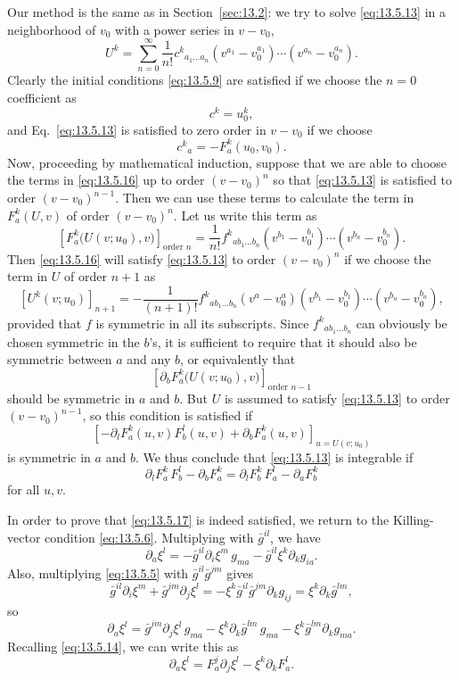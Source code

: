 Our method is the same as in Section~\ref{sec:13.2}: we try to solve
\eqref{eq:13.5.13} in a neighborhood of \(v_0\) with a power series in
\(v-v_0\),
\begin{equation}
  U^k
  =
  \sum_{n=0}^{\infty}
  \frac1{n!}
  c^k{}_{a_1\ldots a_n}
  (v^{a_1}-v_0^{a_1})\cdots(v^{a_n}-v_0^{a_n}).
  \tag{13.5.16}\label{eq:13.5.16}
\end{equation}
Clearly the initial conditions \eqref{eq:13.5.9} are satisfied if we choose
the \(n=0\) coefficient as
\[
  c^k=u_0^k,
\]
and Eq.~\eqref{eq:13.5.13} is satisfied to zero order in \(v-v_0\) if we
choose
\[
  c^k{}_a=-F_a^k(u_0,v_0).
\]
Now, proceeding by mathematical induction, suppose that we are able to
choose the terms in \eqref{eq:13.5.16} up to order \((v-v_0)^n\) so that
\eqref{eq:13.5.13} is satisfied to order \((v-v_0)^{n-1}\). Then we can
use these terms to calculate the term in \(F_a^k(U,v)\) of order
\((v-v_0)^n\). Let us write this term as
\[
  \left[
    F_a^k\bigl(U(v;u_0),v\bigr)
  \right]_{\text{order }n}
  =
  \frac1{n!}
  f^k{}_{a b_1\ldots b_n}
  (v^{b_1}-v_0^{b_1})\cdots(v^{b_n}-v_0^{b_n}).
\]
Then \eqref{eq:13.5.16} will satisfy \eqref{eq:13.5.13} to order
\((v-v_0)^n\) if we choose the term in \(U\) of order \(n+1\) as
\[
  \left[U^k(v;u_0)\right]_{n+1}
  =
  -\frac1{(n+1)!}
  f^k{}_{a b_1\ldots b_n}
  (v^a-v_0^a)
  (v^{b_1}-v_0^{b_1})\cdots(v^{b_n}-v_0^{b_n}),
\]
provided that \(f\) is symmetric in all its subscripts. Since
\(f^k{}_{a b_1\ldots b_n}\) can obviously be chosen symmetric in the
\(b\)'s, it is sufficient to require that it should also be symmetric
between \(a\) and any \(b\), or equivalently that
\[
  \left[
    \partial_b F_a^k\bigl(U(v;u_0),v\bigr)
  \right]_{\text{order }n-1}
\]
should be symmetric in \(a\) and \(b\). But \(U\) is assumed to satisfy
\eqref{eq:13.5.13} to order \((v-v_0)^{n-1}\), so this condition is
satisfied if
\[
  \left[
    -\partial_lF_a^k(u,v)F_b^l(u,v)
    +\partial_bF_a^k(u,v)
  \right]_{u=U(v;u_0)}
\]
is symmetric in \(a\) and \(b\). We thus conclude that
\eqref{eq:13.5.13} is integrable if
\begin{equation}
  \partial_lF_a^k\,F_b^l-\partial_bF_a^k
  =
  \partial_lF_b^k\,F_a^l-\partial_aF_b^k
  \tag{13.5.17}\label{eq:13.5.17}
\end{equation}
for all \(u,v\).

In order to prove that \eqref{eq:13.5.17} is indeed satisfied, we return to
the Killing-vector condition \eqref{eq:13.5.6}. Multiplying with
\(\bar g^{il}\), we have
\[
  \partial_a\xi^l
  =
  -\bar g^{il}\partial_i\xi^m\,g_{ma}
  -\bar g^{il}\xi^k\partial_k g_{ia}.
\]
Also, multiplying \eqref{eq:13.5.5} with
\(\bar g^{il}\bar g^{jm}\) gives
\[
  \bar g^{il}\partial_i\xi^m
  +\bar g^{jm}\partial_j\xi^l
  =
  -\xi^k\bar g^{il}\bar g^{jm}\partial_k g_{ij}
  =
  \xi^k\partial_k\bar g^{lm},
\]
so
\[
  \partial_a\xi^l
  =
  \bar g^{jm}\partial_j\xi^l\,g_{ma}
  -\xi^k\partial_k\bar g^{lm}\,g_{ma}
  -\xi^k\bar g^{lm}\partial_k g_{ma}.
\]
Recalling \eqref{eq:13.5.14}, we can write this as
\begin{equation}
  \partial_a\xi^l
  =
  F_a^j\partial_j\xi^l-\xi^k\partial_kF_a^l.
  \tag{13.5.18}\label{eq:13.5.18}
\end{equation}

